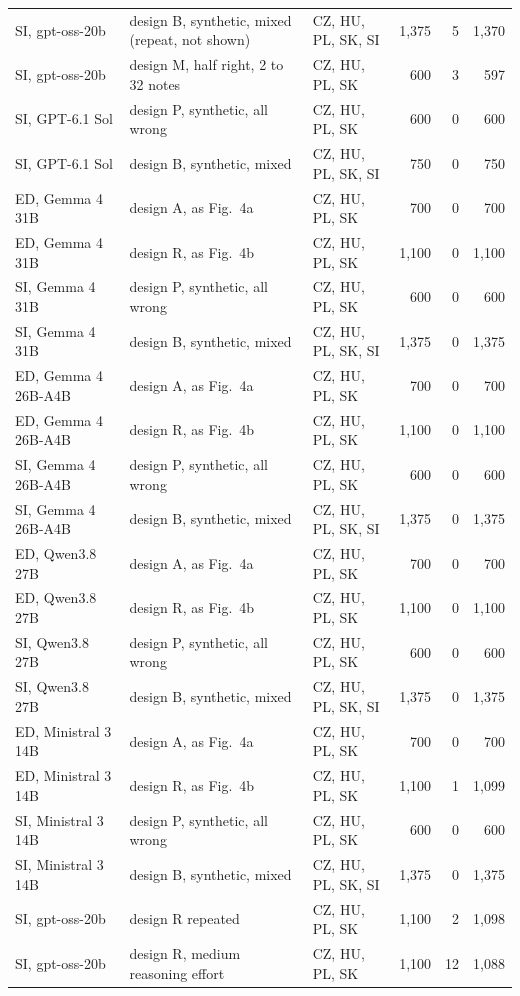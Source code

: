 \begin{tabular}{lp{5.4cm}lrrr}
SI, gpt-oss-20b & design B, synthetic, mixed (repeat, not shown) & CZ, HU, PL, SK, SI & 1,375 & 5 & 1,370 \\
SI, gpt-oss-20b & design M, half right, 2 to 32 notes & CZ, HU, PL, SK & 600 & 3 & 597 \\
SI, GPT-6.1 Sol & design P, synthetic, all wrong & CZ, HU, PL, SK & 600 & 0 & 600 \\
SI, GPT-6.1 Sol & design B, synthetic, mixed & CZ, HU, PL, SK, SI & 750 & 0 & 750 \\
ED, Gemma 4 31B & design A, as Fig.~4a & CZ, HU, PL, SK & 700 & 0 & 700 \\
ED, Gemma 4 31B & design R, as Fig.~4b & CZ, HU, PL, SK & 1,100 & 0 & 1,100 \\
SI, Gemma 4 31B & design P, synthetic, all wrong & CZ, HU, PL, SK & 600 & 0 & 600 \\
SI, Gemma 4 31B & design B, synthetic, mixed & CZ, HU, PL, SK, SI & 1,375 & 0 & 1,375 \\
ED, Gemma 4 26B-A4B & design A, as Fig.~4a & CZ, HU, PL, SK & 700 & 0 & 700 \\
ED, Gemma 4 26B-A4B & design R, as Fig.~4b & CZ, HU, PL, SK & 1,100 & 0 & 1,100 \\
SI, Gemma 4 26B-A4B & design P, synthetic, all wrong & CZ, HU, PL, SK & 600 & 0 & 600 \\
SI, Gemma 4 26B-A4B & design B, synthetic, mixed & CZ, HU, PL, SK, SI & 1,375 & 0 & 1,375 \\
ED, Qwen3.8 27B & design A, as Fig.~4a & CZ, HU, PL, SK & 700 & 0 & 700 \\
ED, Qwen3.8 27B & design R, as Fig.~4b & CZ, HU, PL, SK & 1,100 & 0 & 1,100 \\
SI, Qwen3.8 27B & design P, synthetic, all wrong & CZ, HU, PL, SK & 600 & 0 & 600 \\
SI, Qwen3.8 27B & design B, synthetic, mixed & CZ, HU, PL, SK, SI & 1,375 & 0 & 1,375 \\
ED, Ministral 3 14B & design A, as Fig.~4a & CZ, HU, PL, SK & 700 & 0 & 700 \\
ED, Ministral 3 14B & design R, as Fig.~4b & CZ, HU, PL, SK & 1,100 & 1 & 1,099 \\
SI, Ministral 3 14B & design P, synthetic, all wrong & CZ, HU, PL, SK & 600 & 0 & 600 \\
SI, Ministral 3 14B & design B, synthetic, mixed & CZ, HU, PL, SK, SI & 1,375 & 0 & 1,375 \\
SI, gpt-oss-20b & design R repeated & CZ, HU, PL, SK & 1,100 & 2 & 1,098 \\
SI, gpt-oss-20b & design R, medium reasoning effort & CZ, HU, PL, SK & 1,100 & 12 & 1,088 \\
\bottomrule
\end{tabular}
